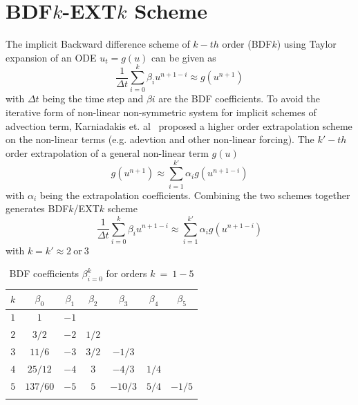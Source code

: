 \section{BDF$k$-EXT$k$ Scheme}\label{bdf}
The implicit Backward difference scheme of $k-th$ order (BDF$k$) using Taylor expansion of an ODE $u_t = g(u)$ can be given as
\begin{equation}
\frac{1}{\Delta t}\sum_{i=0}^{k}\beta_{i}u^{n+1-i} \approx g(u^{n+1})
\end{equation}
with $\Delta t$ being the time step and $\beta{i}$ are the BDF coefficients. To avoid the iterative form of non-linear non-symmetric system for implicit schemes of advection term, Karniadakis et. al~\cite{kar2} proposed a higher order extrapolation scheme on the non-linear terms (e.g. adevtion and other non-linear forcing). The $k'-th$ order extrapolation of a general non-linear term $g(u)$
\begin{equation}
g(u^{n+1}) \approx \sum_{i=1}^{k'}\alpha_{i}g(u^{n+1-i})
\end{equation}
with $\alpha_i$ being the extrapolation coefficients.
Combining the two schemes together generates BDF$k$/EXT$k$ scheme
\begin{equation}
\frac{1}{\Delta t}\sum_{i=0}^{k}\beta_{i}u^{n+1-i} \approx \sum_{i=1}^{k'}\alpha_{i}g(u^{n+1-i})
\end{equation}
with $k=k' \approx 2 \ \mbox{or} \ 3$
\begin{table}[ht] 
\centering %
\begin{tabular}{c c c c c c c} %
\hline\hline    %
$k$ & $\beta_0$ & $\beta_1$ & $\beta_2$ & $\beta_3$ & $\beta_4$ & $\beta_5$  \\ [0.5 ex] %
\hline  %
$1$ & $1$ & $-1$  \\
$2$ & ${3}/{2}$ & $-2$ & ${1}/{2}$  \\
$3$ & ${11}/{6}$ & $-3$ & ${3}/{2}$ & $-1/3$ \\
$4$ & ${25}/{12}$ & $-4$ & $3$ & $-{4}/{3}$ & $1/4$ \\
$5$ & ${137}/{60}$ & $-5$ & $5$ & $-{10}/{3}$ & $5/4$ & $-1/5$  \\
\hline \\ [1 ex]
\end{tabular} 
\caption[BDF Coefficients]{BDF coefficients $\beta_{i=0}^{k}$ for orders $k\ = \ 1-5$} %
\label{table:BDF} %
\end{table} 
